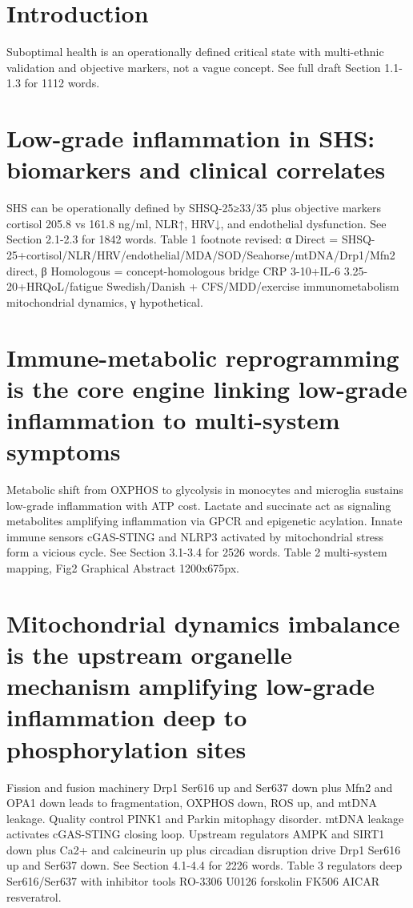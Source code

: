 \documentclass[review]{elsarticle}
\begin{document}
\linenumbers


\section{Introduction}
Suboptimal health is an operationally defined critical state with multi-ethnic validation and objective markers, not a vague concept. See full draft Section 1.1-1.3 for 1112 words.

\section{Low-grade inflammation in SHS: biomarkers and clinical correlates}
SHS can be operationally defined by SHSQ-25≥33/35 plus objective markers cortisol 205.8 vs 161.8 ng/ml, NLR↑, HRV↓, and endothelial dysfunction. See Section 2.1-2.3 for 1842 words. Table 1 footnote revised: α Direct = SHSQ-25+cortisol/NLR/HRV/endothelial/MDA/SOD/Seahorse/mtDNA/Drp1/Mfn2 direct, β Homologous = concept-homologous bridge CRP 3-10+IL-6 3.25-20+HRQoL/fatigue Swedish/Danish + CFS/MDD/exercise immunometabolism mitochondrial dynamics, γ hypothetical.

\section{Immune-metabolic reprogramming is the core engine linking low-grade inflammation to multi-system symptoms}
Metabolic shift from OXPHOS to glycolysis in monocytes and microglia sustains low-grade inflammation with ATP cost. Lactate and succinate act as signaling metabolites amplifying inflammation via GPCR and epigenetic acylation. Innate immune sensors cGAS-STING and NLRP3 activated by mitochondrial stress form a vicious cycle. See Section 3.1-3.4 for 2526 words. Table 2 multi-system mapping, Fig2 Graphical Abstract 1200x675px.

\section{Mitochondrial dynamics imbalance is the upstream organelle mechanism amplifying low-grade inflammation deep to phosphorylation sites}
Fission and fusion machinery Drp1 Ser616 up and Ser637 down plus Mfn2 and OPA1 down leads to fragmentation, OXPHOS down, ROS up, and mtDNA leakage. Quality control PINK1 and Parkin mitophagy disorder. mtDNA leakage activates cGAS-STING closing loop. Upstream regulators AMPK and SIRT1 down plus Ca2+ and calcineurin up plus circadian disruption drive Drp1 Ser616 up and Ser637 down. See Section 4.1-4.4 for 2226 words. Table 3 regulators deep Ser616/Ser637 with inhibitor tools RO-3306 U0126 forskolin FK506 AICAR resveratrol.
\end{document}
